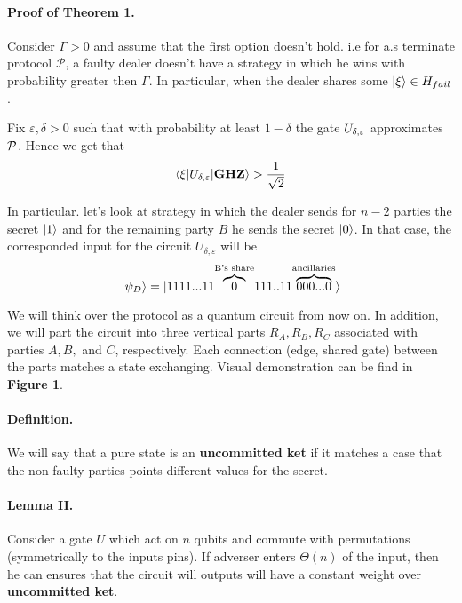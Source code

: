\documentclass{article}
\begin{document}
\begin{multicols*}{2}
\paragraph{Proof of Theorem 1.} Consider \( \Gamma > 0 \) and assume that the first option doesn't hold. i.e for a.s terminate protocol \( \mathcal{P} \), a faulty dealer doesn't have a strategy in which he wins with probability greater then \( \Gamma \). In particular, when the dealer shares some \( \ket{ \xi} \in H_{fail} \).

Fix \(\varepsilon, \delta > 0\) such that with probability at least \(1-\delta\) the gate \( U_{\delta,\varepsilon } \) approximates \( \mathcal{P} \). Hence we get that  \begin{equation*}
    \braket{ \xi | U_{\delta,\varepsilon } | \mathbf{GHZ}} > \frac{1}{\sqrt{2}} 
\end{equation*} 


In particular. let's look at strategy in which the dealer sends for \( n-2 \) parties the secret \( \ket{1} \) and for the remaining party \(B\) he sends the secret \( \ket{0}\). In that case, the corresponded input for the circuit \( U_{\delta, \varepsilon} \) will be
\begin{equation*}
    \ket{\psi_{D}} = \ket{1111...11\overset{\text{B's share}}{\overbrace{0}}111..11\overset{\text{ancillaries}}{\overbrace{000...0}}}
\end{equation*}

We will think over the protocol as a quantum circuit from now on. 
In addition, we will part the circuit into three vertical parts \(R_{A}, R_{B}, R_{C}\) associated with parties \(A, B,\) and \(C\), respectively. Each connection (edge, shared gate) between the parts matches a state exchanging. Visual demonstration can be find in \textbf{Figure 1}.   



\paragraph{Definition.} We will say that a pure state is an \textbf{uncommitted ket} if it matches a case that the non-faulty parties points different values for the secret.  

\paragraph{Lemma II.} Consider a gate \(U\) which act on \(n\) qubits and commute with permutations (symmetrically to the inputs pins). If adverser enters \(\Theta\left(n\right)\) of the input, then he can ensures that the circuit will outputs will have a constant weight over \textbf{uncommitted ket}.  



\end{multicols*}
\end{document}
